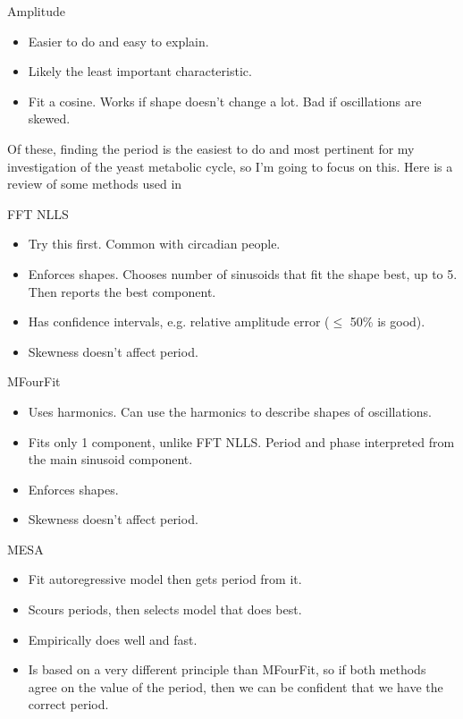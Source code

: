 Amplitude
\begin{itemize}
\item Easier to do and easy to explain.
\item Likely the least important characteristic.
\item Fit a cosine.  Works if shape doesn't change a lot.  Bad if oscillations are skewed.
\end{itemize}

Of these, finding the period is the easiest to do and most pertinent for my investigation of the yeast metabolic cycle, so I'm going to focus on this.
Here is a review of some methods used in \textcite{zielinskiStrengthsLimitationsPeriod2014}

FFT NLLS
\begin{itemize}
\item Try this first.  Common with circadian people.
\item Enforces shapes.  Chooses number of sinusoids that fit the shape best, up to 5.  Then reports the best component.
\item Has confidence intervals, e.g. relative amplitude error ($\leq$ 50\% is good).
\item Skewness doesn't affect period.
\end{itemize}

MFourFit
\begin{itemize}
\item Uses harmonics.  Can use the harmonics to describe shapes of oscillations.
\item Fits only 1 component, unlike FFT NLLS.  Period and phase interpreted from the main sinusoid component.
\item Enforces shapes.
\item Skewness doesn't affect period.
\end{itemize}

MESA
\begin{itemize}
\item Fit autoregressive model then gets period from it.
\item Scours periods, then selects model that does best.
\item Empirically does well and fast.
\item Is based on a very different principle than MFourFit, so if both methods agree on the value of the period, then we can be confident that we have the correct period.
\end{itemize}

